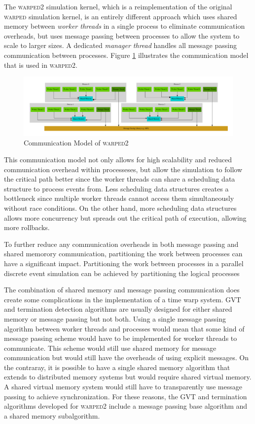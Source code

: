 \documentclass[11pt]{book}
\begin{document}
The \textsc{warped2} simulation kernel, which is a reimplementation of the original
\textsc{warped} simulation kernel, is an entirely different approach which uses shared
memory between \emph{worker threads} in a single process to eliminate communication overheads,
but uses message passing between processes to allow the system to scale to larger sizes.
A dedicated \emph{manager thread} handles all message passing communication between processes.
Figure \ref{warped2_communication} illustrates the communication model that is used in
\textsc{warped2}.

\begin{figure}[H]
    \centering
    \includegraphics[width=\textwidth]{figs/graphviz/warped_communication.pdf}
    \caption{Communication Model of \textsc{warped2}}\label{warped2_communication}
\end{figure}

This communication model not only allows for high scalability and reduced communication
overhead within processeses, but allow the simulation to follow the critical path better
since the worker threads can share a scheduling data structure to process events from.
Less scheduling data structures creates a bottleneck since multiple worker threads cannot
access them simultaneously without race conditions. On the other hand, more scheduling
data structures allows more concurrency but spreads out the critical path of execution,
allowing more rollbacks.

To further reduce any communication overheads in both message passing and shared memorory
communication, partitioning the work between processes can have a significant impact.
Partitioning the work between processes in a parallel discrete event simulation can be
achieved by partitioning the logical processes 

The combination of shared memory and message passing communication does create some
complications in the implementation of a time warp system. GVT and termination detection
algorithms are usually designed for either shared memory or message passing but not both.
Using a single message passing algorithm between worker threads and processes would mean
that some kind of message passing scheme would have to be implemented for worker threads
to communicate. This scheme would still use shared memory for message communication but
would still have the overheads of using explicit messages. On the contraray, it is possible
to have a single shared memory algorithm that extends to distributed memory systems but
would require shared virtual memory. A shared virtual memory system would still have to
transparently use message passing to achieve synchronization. For these reasons, the
GVT and termination algorithms developed for \textsc{warped2} include a message passing
base algorithm and a shared memory subalgorithm.
\end{document}

